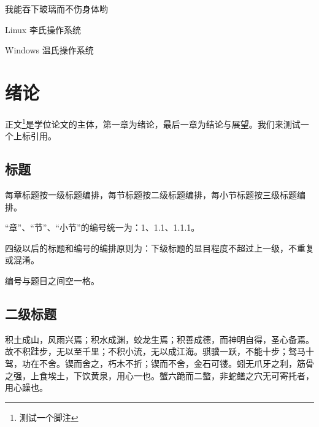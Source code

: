 \documentclass[
    doctor,
    pdflinks,
    ]{xjtuthesis}
\begin{document}
    \xjtuchead

    \xjtuehead

    \xjtucinfopage

    \xjtueinfopage
    
    \xjtutoc

    \xjtutoe
    \clearpage

    \xjtucontent

    \begin{denotation}

      \item[\xjtuthesis]    我能吞下玻璃而不伤身体哟
      \item[Linux]          李氏操作系统
      \item[Windows]        温氏操作系统

    \end{denotation}

    \cleardoublepage

    \chapter{绪论}

    正文\footnote{测试一个脚注}是学位论文的主体，第一章为绪论，最后一章为结论与展望。我们来测试一个上标引用\cite{niubi-paper}。
        
        \section{标题}

        每章标题按一级标题编排，每节标题按二级标题编排，每小节标题按三级标题编排。

        “章”、“节”、“小节”的编号统一为：1、1.1、1.1.1。

        四级以后的标题和编号的编排原则为：下级标题的显目程度不超过上一级，不重复或混淆。

        编号与题目之间空一格。


        \section{二级标题}


            积土成山，风雨兴焉；积水成渊，蛟龙生焉；积善成德，而神明自得，圣心备焉。故不积跬步，无以至千里；不积小流，无以成江海。骐骥一跃，不能十步；驽马十驾，功在不舍。锲而舍之，朽木不折；锲而不舍，金石可镂。蚓无爪牙之利，筋骨之强，上食埃土，下饮黄泉，用心一也。蟹六跪而二螯，非蛇鳝之穴无可寄托者，用心躁也。 
\end{document}
